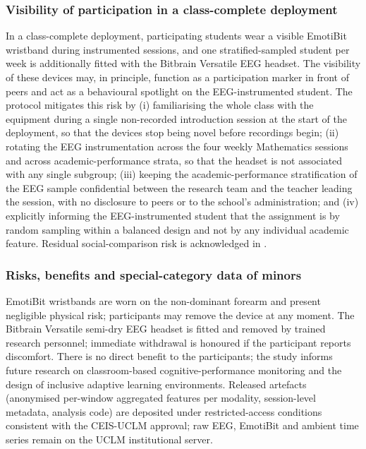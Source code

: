 \subsubsection{Visibility of participation in a class-complete deployment}\label{subsec:eeg-spotlight}

In a class-complete deployment, participating students wear a visible EmotiBit wristband during instrumented sessions, and one stratified-sampled student per week is additionally fitted with the Bitbrain Versatile EEG headset. The visibility of these devices may, in principle, function as a participation marker in front of peers and act as a behavioural spotlight on the EEG-instrumented student. The protocol mitigates this risk by (i) familiarising the whole class with the equipment during a single non-recorded introduction session at the start of the deployment, so that the devices stop being novel before recordings begin; (ii) rotating the EEG instrumentation across the four weekly Mathematics sessions and across academic-performance strata, so that the headset is not associated with any single subgroup; (iii) keeping the academic-performance stratification of the EEG sample confidential between the research team and the teacher leading the session, with no disclosure to peers or to the school's administration; and (iv) explicitly informing the EEG-instrumented student that the assignment is by random sampling within a balanced design and not by any individual academic feature. Residual social-comparison risk is acknowledged in .

\subsubsection{Risks, benefits and special-category data of minors}

EmotiBit wristbands are worn on the non-dominant forearm and present negligible physical risk; participants may remove the device at any moment. The Bitbrain Versatile semi-dry EEG headset is fitted and removed by trained research personnel; immediate withdrawal is honoured if the participant reports discomfort. There is no direct benefit to the participants; the study informs future research on classroom-based cognitive-performance monitoring and the design of inclusive adaptive learning environments. Released artefacts (anonymised per-window aggregated features per modality, session-level metadata, analysis code) are deposited under restricted-access conditions consistent with the CEIS-UCLM approval; raw EEG, EmotiBit and ambient time series remain on the UCLM institutional server.

